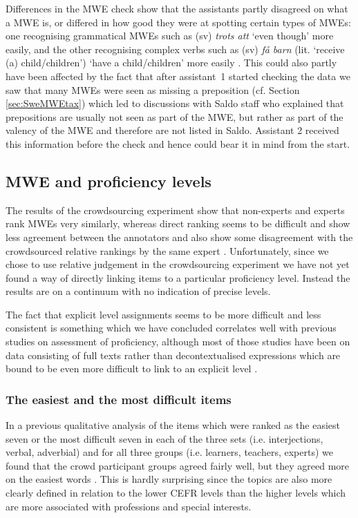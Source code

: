 \documentclass[output=paper,colorlinks,citecolor=brown]{langscibook}
\begin{document}
Differences in the MWE check show that the assistants partly disagreed on what a MWE is, or differed in how good they were at spotting certain types of MWEs: one recognising grammatical MWEs such as (sv) \textit{trots att} ‘even though’ more easily, and the other recognising complex verbs such as (sv) \textit{få barn} 
(lit. `receive (a) child/children') ‘have a child/children’ more easily \citep[][]{volodina2022annotation}{}{}. This could also partly have been affected by the fact that after assistant~1 started checking the data we saw that many MWEs were seen as missing a preposition (cf. Section \ref{sec:SweMWEtax}) which led to discussions with Saldo staff who explained that prepositions are usually not seen as part of the MWE, but rather as part of the valency of the MWE and therefore are not listed in Saldo. Assistant 2 received this information before the check and hence could bear it in mind from the start.


\subsection{MWE and proficiency levels}
\label{sec:MWElevel}

The results of the crowdsourcing experiment show that non-experts and experts rank MWEs very similarly, whereas direct ranking seems to be difficult and show less agreement between the annotators and also show some disagreement with the crowdsourced relative rankings by the same expert \citep{alfter2021mwe}. 
Unfortunately, since we chose to use relative judgement in the crowdsourcing experiment we have not yet found a way of directly linking items to a particular proficiency level.  
Instead the results are on a continuum with no indication of precise levels. 

The fact that explicit level assignments seems to be more difficult and less consistent is something which we have concluded correlates well with previous studies on assessment of proficiency, although most of those studies have been on data consisting of full texts rather than decontextualised expressions which are bound to be even more difficult to link to an explicit level \citep{alfter2021mwe}. 

\subsubsection{The easiest and the most difficult items} \label{sec:easiest}
In a previous qualitative analysis of the items which were ranked as the easiest seven or the most difficult seven in each of the three sets (i.e. interjections, verbal, adverbial) and for all three groups (i.e. learners, teachers, experts) we found that the crowd participant groups agreed fairly well, but they agreed more on the easiest words \citep{lindstrom2022MWE}. This is hardly surprising since the topics are also more clearly defined in relation to the lower CEFR levels than the higher levels which are more associated with professions and special interests. 
\end{document}
